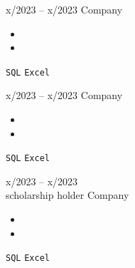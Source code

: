 \documentclass[9pt]{developercv} %
\begin{document}
\vspace{-10 pt}
\begin{entrylist}
	\entry
        {x/2023 -- x/2023}
		{\lipsum[1][1]}
		{Company}
		{\vspace{-10pt}
        \begin{itemize}[noitemsep,topsep=0pt,parsep=0pt,partopsep=0pt, leftmargin=-1pt]
            \item \lipsum[1][1-2]
            \item \lipsum[1][3-4]
        \end{itemize} 
        \texttt{SQL} \slashsep \texttt{Excel}}
	\entry
		{x/2023 -- x/2023}
		{\lipsum[1][1]}
		{Company}
		{\vspace{-10pt}
        \begin{itemize}[noitemsep,topsep=0pt,parsep=0pt,partopsep=0pt, leftmargin=-1pt]
            \item \lipsum[1][1-2]
            \item \lipsum[1][3-4]
        \end{itemize} 
        \texttt{SQL} \slashsep \texttt{Excel}}
	\entry
		{x/2023 -- x/2023 \\\footnotesize{scholarship holder}}
		{\lipsum[1][1]}
		{Company}
		{\vspace{-10pt}
        \begin{itemize}[noitemsep,topsep=0pt,parsep=0pt,partopsep=0pt, leftmargin=-1pt]
            \item \lipsum[1][1-2]
            \item \lipsum[1][3-4]
        \end{itemize} 
        \texttt{SQL} \slashsep \texttt{Excel}}
\end{entrylist}
\end{document}
